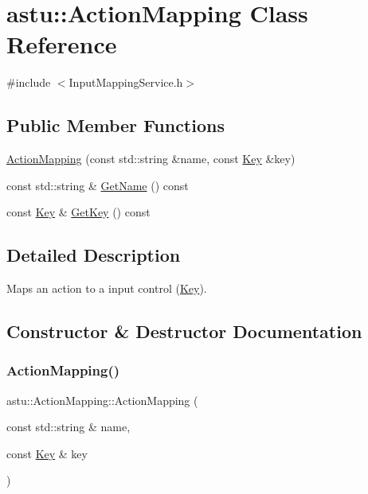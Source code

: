 \hypertarget{classastu_1_1ActionMapping}{}\section{astu\+:\+:Action\+Mapping Class Reference}
\label{classastu_1_1ActionMapping}


{\ttfamily \#include $<$Input\+Mapping\+Service.\+h$>$}

\subsection*{Public Member Functions}
\begin{DoxyCompactItemize}
\item 
\hyperlink{classastu_1_1ActionMapping_abf1c1813dda3c6beda49e460a5989ae7}{Action\+Mapping} (const std\+::string \&name, const \hyperlink{classastu_1_1Key}{Key} \&key)
\item 
const std\+::string \& \hyperlink{classastu_1_1ActionMapping_a2a7b1b72d7d36812c79f05b1cad46095}{Get\+Name} () const
\item 
const \hyperlink{classastu_1_1Key}{Key} \& \hyperlink{classastu_1_1ActionMapping_a6a7454094642d1ed34159ac0be511760}{Get\+Key} () const
\end{DoxyCompactItemize}


\subsection{Detailed Description}
Maps an action to a input control (\hyperlink{classastu_1_1Key}{Key}). 

\subsection{Constructor \& Destructor Documentation}
\mbox{\label{classastu_1_1ActionMapping_abf1c1813dda3c6beda49e460a5989ae7}} 
\subsubsection{\texorpdfstring{Action\+Mapping()}{ActionMapping()}}
{\footnotesize\ttfamily astu\+::\+Action\+Mapping\+::\+Action\+Mapping (\begin{DoxyParamCaption}\item[{const std\+::string \&}]{name,  }\item[{const \hyperlink{classastu_1_1Key}{Key} \&}]{key }\end{DoxyParamCaption})}

